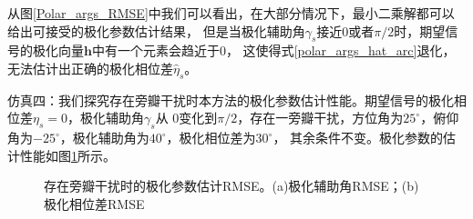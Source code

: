 \documentclass[master]{thesis-uestc}
\begin{document}
从图\ref{Polar_args_RMSE}中我们可以看出，在大部分情况下，最小二乘解都可以给出可接受的极化参数估计结果，
但是当极化辅助角$\gamma_s$接近0或者$\pi/2$时，期望信号的极化向量$\bm{h}$中有一个元素会趋近于0，
这使得式\eqref{polar_args_hat_arc}退化，无法估计出正确的极化相位差$\hat{\eta}_s$。

仿真四：我们探究存在旁瓣干扰时本方法的极化参数估计性能。期望信号的极化相位差$\eta_s=0$，极化辅助角$\gamma_s$从
$0$变化到$\pi/2$，存在一旁瓣干扰，方位角为$25^\circ$，俯仰角为$-25^\circ$，极化辅助角为$40^\circ$，极化相位差为$30^\circ$，
其余条件不变。极化参数的估计性能如图\ref{Polar_args_RMSE_SLJ}所示。
\begin{figure}[H]
    \caption{存在旁瓣干扰时的极化参数估计RMSE。(a)极化辅助角RMSE；(b)极化相位差RMSE}
    \label{Polar_args_RMSE_SLJ}
\end{figure}
\end{document}
